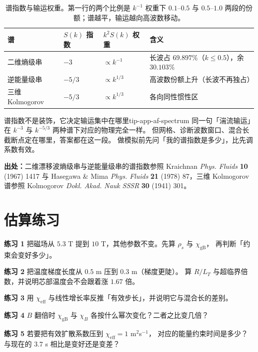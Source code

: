 \begin{table}[htbp]
\centering
\small
\caption{谱指数与输运权重。第一行的两个比例是 $k^{-1}$ 权重下
$0.1$--$0.5$ 与 $0.5$--$1.0$ 两段的份额；谱越平，输运越向高波数移动。}
\label{tab:app-af-spectrum}
\begin{tabular}{p{3.6cm}p{3.0cm}p{3.4cm}p{3.2cm}}
\toprule
谱 & $S(k)$ 指数 & $k^2S(k)$ 权重 & 含义 \\
\midrule
二维熵级串 & $-3$ & $\propto k^{-1}$ & 长波占 $69.897\%$（$k\le0.5$），余 $30.103\%$ \\
逆能量级串 & $-5/3$ & $\propto k^{1/3}$ & 高波数份额上升（长波不再独占） \\
三维 Kolmogorov & $-5/3$ & $\propto k^{1/3}$ & 各向同性惯性区 \\
\bottomrule
\end{tabular}

\end{table}

\begin{tip}{谱指数不是装饰，它决定输运集中在哪里}{tip-app-af-spectrum}
同一句「湍流输运」在 $k^{-3}$ 与 $k^{-5/3}$ 两种谱下对应的物理完全一样。
但网格、诊断波数窗口、混合长截断点定在哪里，答案都在这一段。
做模拟前先问「我的谱指数是多少」，比先调系数有效。
\end{tip}

{\footnotesize
\textbf{出处：}二维漂移波熵级串与逆能量级串的谱指数参照 Kraichnan \emph{Phys. Fluids}
\textbf{10} (1967) 1417 与 Hasegawa \& Mima \emph{Phys. Fluids} \textbf{21} (1978) 87，三维 Kolmogorov 谱参照 Kolmogorov \emph{Dokl. Akad. Nauk SSSR} \textbf{30} (1941) 301。
}

\section{估算练习}
\label{sec:app-af-problems}

\textbf{练习 1} 把磁场从 $5.3$ T 提到 $10$ T，其他参数不变。先算 $\rho_s$ 与 $\chi_{\mathrm{gB}}$，
再判断「约束会变好多少」。

\textbf{练习 2} 把温度梯度长度从 $0.5$ m 压到 $0.3$ m（梯度更陡）。
算 $R/L_T$ 与超临界倍数，并说明芯部温度会不会跟着涨 $1.67$ 倍。

\textbf{练习 3} 用 $\chi_{\mathrm{eff}}$ 与线性增长率反推「有效步长」，并说明它与混合长的差别。

\textbf{练习 4} $B$ 翻倍时 $\chi_{\mathrm{gB}}$ 与 $\chi_B$ 各按什么幂次变化？二者之比变几倍？

\textbf{练习 5} 若要把有效扩散系数压到 $\chi_{\mathrm{eff}}=1$ m$^2$s$^{-1}$，
对应的能量约束时间是多少？与现在的 $3.7$ s 相比是变好还是变差？

